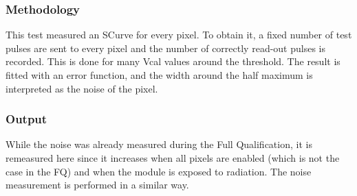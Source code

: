 \documentclass[a4paper,12pt,twoside]{article}
\begin{document}
\subsubsection{Methodology}
This test measured an SCurve for every pixel. To obtain it, a fixed number of test pulses are sent to every pixel and the number of correctly read-out pulses is recorded. This is done for many Vcal values around the threshold. The result is fitted with an error function, and the width around the half maximum is interpreted as the noise of the pixel.
\subsubsection{Output}
While the noise was already measured during the Full Qualification, it is remeasured here since it increases when all pixels are enabled (which is not the case in the FQ) and when the module is exposed to radiation. The noise measurement is performed in a similar way.
\end{document}
